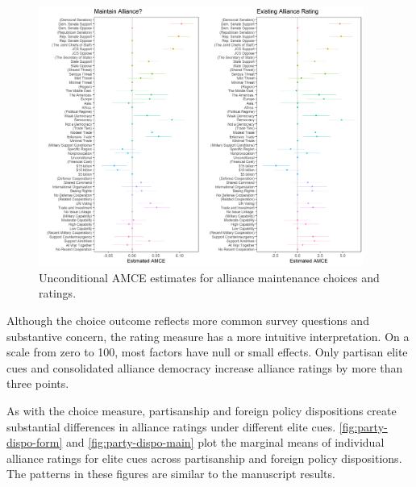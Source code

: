 \documentclass[12pt]{article}
\begin{document}
\begin{figure}
	\centering
		\includegraphics[width=0.95\textwidth]{maintenance-plots.png}
	\caption{Unconditional AMCE estimates for alliance maintenance choices and ratings.}
	\label{fig:maintenance-plots}
\end{figure}


Although the choice outcome reflects more common survey questions and substantive concern, the rating measure has a more intuitive interpretation. 
On a scale from zero to 100, most factors have null or small effects. 
Only partisan elite cues and consolidated alliance democracy increase alliance ratings by more than three points. 


As with the choice measure, partisanship and foreign policy dispositions create substantial differences in alliance ratings under different elite cues.
\autoref{fig:party-dispo-form} and \autoref{fig:party-dispo-main} plot the marginal means of individual alliance ratings for elite cues across partisanship and foreign policy dispositions. 
The patterns in these figures are similar to the manuscript results.  
\end{document}
